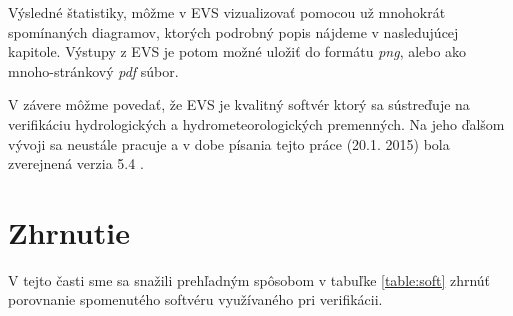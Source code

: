 Výsledné štatistiky, môžme v EVS vizualizovať pomocou už mnohokrát spomínaných diagramov, ktorých podrobný popis nájdeme v nasledujúcej kapitole. Výstupy z EVS je potom možné uložiť do formátu \textit{png}, alebo ako mnoho-stránkový \textit{pdf} súbor.

V závere môžme povedať, že EVS je kvalitný softvér ktorý sa sústreďuje na verifikáciu hydrologických a hydrometeorologických premenných. Na jeho ďalšom vývoji sa neustále pracuje a v dobe písania tejto práce (20.1. 2015) bola zverejnená verzia 5.4 \cite{EVS}.



\section{Zhrnutie}
V tejto časti sme sa snažili prehľadným spôsobom v tabuľke \ref{table:soft} zhrnúť porovnanie spomenutého softvéru využívaného pri verifikácii.


